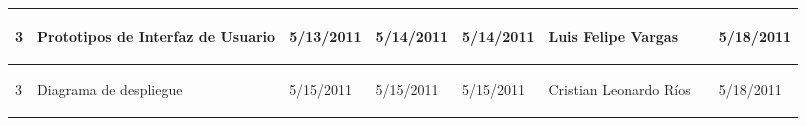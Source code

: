 \begin{center}
\begin{longtable}{|p{}|p{}|p{}|p{}|p{}|p{}|p{}|p{}|}
{\begin{center} 3 \end{center}} & 
{\begin{center} Prototipos de Interfaz de Usuario \end{center}} & 
{\begin{center} 5/13/2011 \end{center}} & 
{\begin{center} 5/14/2011 \end{center}} & 
{\begin{center} 5/14/2011 \end{center}} & 
{\begin{center} Luis Felipe Vargas \end{center}} & 
{\begin{center}  \end{center}} & 
{\begin{center} 5/18/2011 \end{center}}\\
\hline

{\begin{center} 3 \end{center}} & 
{\begin{center} Diagrama de despliegue \end{center}} & 
{\begin{center} 5/15/2011 \end{center}} & 
{\begin{center} 5/15/2011 \end{center}} & 
{\begin{center} 5/15/2011 \end{center}} & 
{\begin{center} Cristian Leonardo Ríos \end{center}} & 
{\begin{center}  \end{center}} & 
{\begin{center} 5/18/2011 \end{center}}\\
\hline


\end{longtable}
\end{center}
